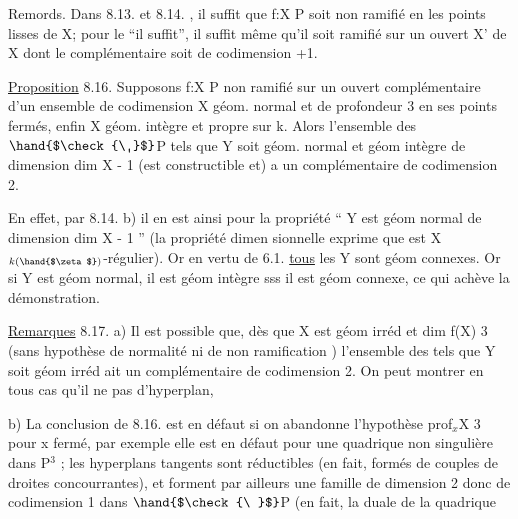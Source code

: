 

Remords. Dans 8.13. et 8.14. , il suffit  que f:X\hand{$\to$} P soit non
ramifié en les points lisses de X; pour le ``il suffit'', il suffit même
qu'il soit  ramifié sur un ouvert X' de X dont le complémentaire soit
de codimension \hand{$\geqslant$} +1.

\uline{Proposition} 8.16. Supposons f:X\hand{$\to$} P non ramifié sur un ouvert
complémentaire d'un ensemble de codimension  X géom. normal et
de profondeur\hand{$\geqslant$} 3 en ses points fermés, enfin X géom. intègre et propre
sur k. Alors l'ensemble des \hand{$\zeta \in$} $\hand{$\check{\ }$}$P tels que 
Y\hand{$_\zeta$} soit géom. normal et géom intègre de dimension dim X - 1 (est
constructible et) a un complémentaire de codimension \hand{$\geqslant$} 2.

En effet, par 8.14. b) il en est ainsi pour la propriété
`` Y\hand{$_\zeta$} est géom normal de dimension dim X - 1 '' (la propriété dimen
sionnelle exprime que \hand{$\phi_\zeta$} est X$_{k(\hand{$\zeta$})}$-régulier). Or en vertu de 6.1.
\uline{tous} les Y\hand{$_\zeta$} sont géom connexes. Or si Y\hand{$_\zeta$} est géom normal, il est
géom intègre sss il est géom connexe, ce qui achève la démonstration.

\uline{Remarques} 8.17. a)  Il est possible que, dès que X est géom irréd
et dim f(X) \hand{$\geqslant$} 3 (sans hypothèse de normalité ni de non ramification )
l'ensemble des \hand{$\zeta$} tels que Y\hand{$_\zeta$} soit géom irréd ait un complémentaire
de codimension \hand{$\geqslant$}2. On peut montrer en tous cas qu'il ne pas
d'hyperplan, 

b) La conclusion de 8.16. est en défaut si on abandonne
l'hypothèse prof$_x$X \hand{$\geqslant$} 3 pour x fermé, par exemple elle est en défaut pour
une quadrique non singulière  dans P$^3$ ;   les hyperplans tangents
 sont  réductibles (en fait, formés de couples de droites
concourrantes), et forment par ailleurs une famille de dimension 2
 donc de codimension 1 dans $\hand{$\check{\ }$}$P (en fait, la duale de la quadrique  
